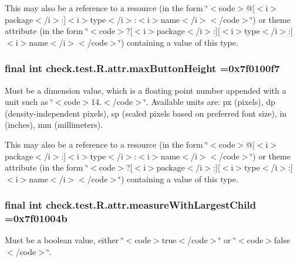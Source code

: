 This may also be a reference to a resource (in the form \char`\"{}$<$code$>$@\mbox{[}$<$i$>$package$<$/i$>$\+:\mbox{]}$<$i$>$type$<$/i$>$\+:$<$i$>$name$<$/i$>$$<$/code$>$\char`\"{}) or theme attribute (in the form \char`\"{}$<$code$>$?\mbox{[}$<$i$>$package$<$/i$>$\+:\mbox{]}\mbox{[}$<$i$>$type$<$/i$>$\+:\mbox{]}$<$i$>$name$<$/i$>$$<$/code$>$\char`\"{}) containing a value of this type. \hypertarget{classcheck_1_1test_1_1_r_1_1attr_abf227cf987d13435370f6f6bb9da1505}{}
\subsubsection[{max\+Button\+Height}]{\setlength{\rightskip}{0pt plus 5cm}final int check.\+test.\+R.\+attr.\+max\+Button\+Height =0x7f0100f7\hspace{0.3cm}{\ttfamily [static]}}\label{classcheck_1_1test_1_1_r_1_1attr_abf227cf987d13435370f6f6bb9da1505}
Must be a dimension value, which is a floating point number appended with a unit such as \char`\"{}$<$code$>$14.\+5sp$<$/code$>$\char`\"{}. Available units are\+: px (pixels), dp (density-\/independent pixels), sp (scaled pixels based on preferred font size), in (inches), mm (millimeters). 

This may also be a reference to a resource (in the form \char`\"{}$<$code$>$@\mbox{[}$<$i$>$package$<$/i$>$\+:\mbox{]}$<$i$>$type$<$/i$>$\+:$<$i$>$name$<$/i$>$$<$/code$>$\char`\"{}) or theme attribute (in the form \char`\"{}$<$code$>$?\mbox{[}$<$i$>$package$<$/i$>$\+:\mbox{]}\mbox{[}$<$i$>$type$<$/i$>$\+:\mbox{]}$<$i$>$name$<$/i$>$$<$/code$>$\char`\"{}) containing a value of this type. \hypertarget{classcheck_1_1test_1_1_r_1_1attr_a48262f79fe5c9e5f34747792592c3f00}{}
\subsubsection[{measure\+With\+Largest\+Child}]{\setlength{\rightskip}{0pt plus 5cm}final int check.\+test.\+R.\+attr.\+measure\+With\+Largest\+Child =0x7f01004b\hspace{0.3cm}{\ttfamily [static]}}\label{classcheck_1_1test_1_1_r_1_1attr_a48262f79fe5c9e5f34747792592c3f00}
Must be a boolean value, either \char`\"{}$<$code$>$true$<$/code$>$\char`\"{} or \char`\"{}$<$code$>$false$<$/code$>$\char`\"{}. 

